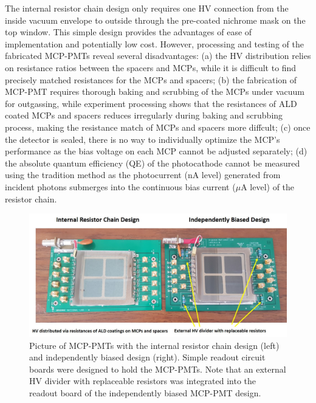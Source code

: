 \documentclass[preprint,5p]{elsarticle}
\begin{document}
The internal resistor chain design only requires one HV connection from the 
inside vacuum envelope to outside through the pre-coated nichrome mask on the 
top window. This simple design provides the advantages of ease of 
implementation and potentially low cost. However, processing and testing of the 
fabricated MCP-PMTs reveal several disadvantages: (a) the HV distribution 
relies on resistance ratios between the spacers and MCPs, while it is difficult 
to find precisely matched resistances for the MCPs and spacers; (b) the 
fabrication of MCP-PMT requires thorough baking and scrubbing of the MCPs under 
vacuum for outgassing, while experiment processing shows that the resistances 
of ALD coated MCPs and spacers reduces irregularly during baking and scrubbing 
process, making the resistance match of MCPs and spacers more diffcult; (c) once 
the detector is sealed, there is no way to individually optimize the MCP’s 
performance as the bias voltage on each MCP cannot be adjusted separately; (d) 
the absolute quantum efficiency (QE) of the photocathode cannot be measured 
using the tradition method as the photocurrent (nA level) generated from 
incident photons submerges into the continuous bias current ($\mu$A level) of 
the resistor chain.      

\begin{figure}[tbp]
\centering \includegraphics[scale=0.7]{fig/Figure2.jpg}
 \caption{Picture of MCP-PMTs with the internal resistor chain design (left) 
   and independently biased design (right). Simple readout circuit boards were 
   designed to hold the MCP-PMTs. Note that an external HV divider with 
   replaceable resistors was integrated into the readout board of the 
   independently biased MCP-PMT design. } \label{fig:design}
\end{figure}
\end{document}
